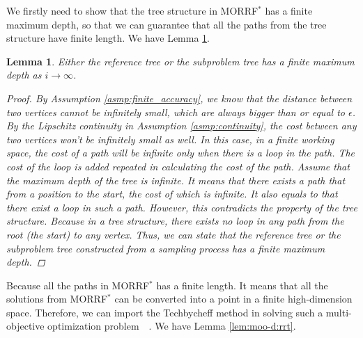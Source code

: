 \documentclass{article}
\newtheorem{lem}{Lemma}
\begin{document}
We firstly need to show that the tree structure in MORRF$^{*}$ has a finite maximum depth,
so that we can guarantee that all the paths from the tree structure have finite length.
We have Lemma \ref{lem:tree:finite_depth}.

\begin{lem}
\label{lem:tree:finite_depth}
Either the reference tree or the subproblem tree has a finite maximum depth as $ i \rightarrow \infty $.
\begin{proof}
By Assumption \ref{asmp:finite_accuracy}, we know that the distance between two vertices cannot be infinitely small, which are always bigger than or equal to $ \epsilon $.
By the Lipschitz continuity in Assumption \ref{asmp:continuity}, the cost between any two vertices won't be infinitely small as well.
In this case, in a finite working space, the cost of a path will be infinite only when there is a loop in the path.
The cost of the loop is added repeated in calculating the cost of the path.
Assume that the maximum depth of the tree is infinite.
It means that there exists a path that from a position to the start, the cost of which is infinite.
It also equals to that there exist a loop in such a path.
However, this contradicts the property of the tree structure. 
Because in a tree structure, there exists no loop in any path from the root (the start) to any vertex.
Thus, we can state that the reference tree or the subproblem tree constructed from a sampling process has a finite maximum depth.
\end{proof}
\end{lem}

Because all the paths in MORRF$^{*}$ has a finite length.
It means that all the solutions from MORRF$^{*}$ can be converted into a point in a finite high-dimension space.
Therefore, we can import the Techbycheff method in solving such a multi-objective optimization problem~\cite{4358754}~\cite{miettinen1999nonlinear}.
We have Lemma \ref{lem:moo-d:rrt}.
\end{document}
